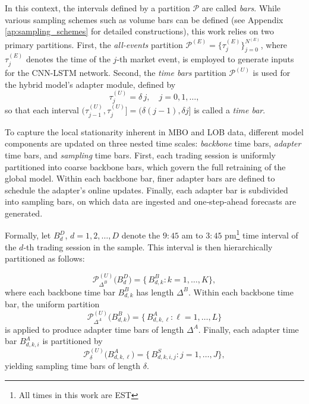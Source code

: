 \documentclass[10pt,a4paper,oneside]{article}
\begin{document}
In this context, the intervals defined by a partition \(\mathcal{P}\) are called \emph{bars}. While various sampling schemes such as volume bars can be defined (see Appendix \ref{ap:sampling_schemes} for detailed constructions), this work relies on two primary partitions. First, the \emph{all-events} partition \(\mathcal{P}^{(E)} = \{\tau^{(E)}_j\}_{j=0}^{N^{(E)}}\), where \(\tau^{(E)}_j\) denotes the time of the \(j\)-th market event, is employed to generate inputs for the CNN-LSTM network. Second, the \emph{time bars} partition \(\mathcal{P}^{(U)}\) is used for the hybrid model's adapter module, defined by
\[
    \tau^{(U)}_j=\delta\,j,\quad j=0,1,\dots,
\]
so that each interval \((\tau^{(U)}_{j-1},\tau^{(U)}_j]=(\delta(j-1),\delta j]\) is called a \emph{time bar}.

To capture the local stationarity inherent in MBO and LOB data, different model components are updated on three nested time scales: \emph{backbone} time bars, \emph{adapter} time bars, and \emph{sampling} time bars.  First, each trading session is uniformly partitioned into coarse backbone bars, which govern the full retraining of the global model.  Within each backbone bar, finer adapter bars are defined to schedule the adapter’s online updates. Finally, each adapter bar is subdivided into sampling bars, on which data are ingested and one‐step‐ahead forecasts are generated.

Formally, let $B^D_d$, $d = 1, 2, \dots, D$ denote the $9:45$ am to $3:45$ pm\footnote{All times in this work are EST} time interval of the $d$-th trading session in the sample. This interval is then hierarchically partitioned as follows:

\[
    \mathcal P^{(U)}_{\Delta^B}\bigl(B^D_d\bigr)
    =\{\,B^B_{d,k}:k=1,\dots,K\},
\]
where each backbone time bar \(B^B_{d,k}\) has length \(\Delta^B\).  Within each backbone time bar, the uniform partition
\[
    \mathcal P^{(U)}_{\Delta^A}\bigl(B^B_{d,k}\bigr)
    =\{\,B^A_{d,k,\ell}:\ell=1,\dots,L\}
\]
is applied to produce adapter time bars of length \(\Delta^A\).  Finally, each adapter time bar \(B^A_{d,k,i}\) is partitioned by
\[
    \mathcal P^{(U)}_{\delta}\bigl(B^A_{d,k,\ell}\bigr)
    =\{\,B^S_{d,k,i,j}:j=1,\dots,J\},
\]
yielding sampling time bars of length \(\delta\).

\end{document}
